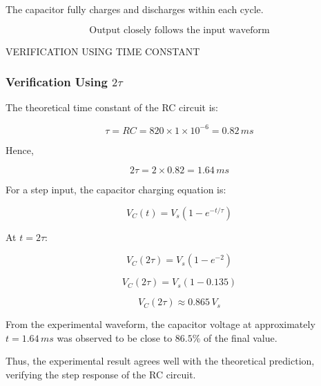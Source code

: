 The capacitor fully charges and discharges within each cycle.

\[
\boxed{\text{Output closely follows the input waveform}}
\]

VERIFICATION USING TIME CONSTANT
\subsubsection{Verification Using $2\tau$}

The theoretical time constant of the RC circuit is:

\[
\tau = RC = 820 \times 1\times10^{-6} = 0.82\,ms
\]

Hence,

\[
2\tau = 2 \times 0.82 = 1.64\,ms
\]

For a step input, the capacitor charging equation is:

\[
V_C(t) = V_s\left(1 - e^{-t/\tau}\right)
\]

At \(t = 2\tau\):

\[
V_C(2\tau) = V_s\left(1 - e^{-2}\right)
\]

\[
V_C(2\tau) = V_s(1 - 0.135)
\]

\[
\boxed{V_C(2\tau) \approx 0.865\,V_s}
\]

From the experimental waveform, the capacitor voltage at approximately
\(t = 1.64\,ms\) was observed to be close to \(86.5\%\) of the final value.

Thus, the experimental result agrees well with the theoretical prediction, verifying the step response of the RC circuit.

